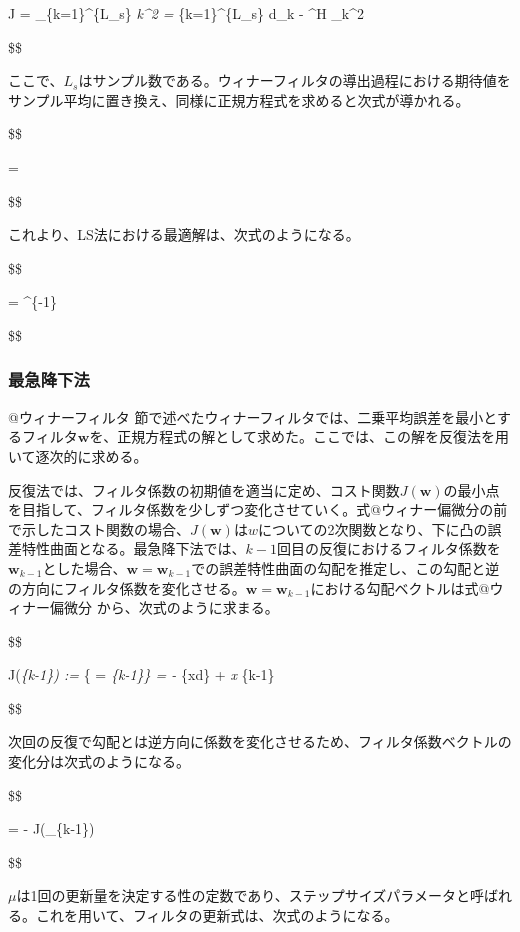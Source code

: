 J = \sum\_\{k=1\}\^{}\{L\_s\} \textbar{}\epsilon\emph{k\textbar\^{}2 =
\sum}\{k=1\}\^{}\{L\_s\} \textbar d\_k - \^{}H
\_k\textbar\^{}2

\$\$

ここで、\(L_s\)はサンプル数である。ウィナーフィルタの導出過程における期待値をサンプル平均に置き換え、同様に正規方程式を求めると次式が導かれる。

\$\$

  = 

\$\$

これより、LS法における最適解は、次式のようになる。

\$\$

 = \^{}\{-1\} 

\$\$

\hypertarget{ux6700ux6025ux964dux4e0bux6cd5}{%
\subsubsection{最急降下法}\label{ux6700ux6025ux964dux4e0bux6cd5}}

@ウィナーフィルタ
節で述べたウィナーフィルタでは、二乗平均誤差を最小とするフィルタ\(\bm{w}\)を、正規方程式の解として求めた。ここでは、この解を反復法を用いて逐次的に求める。

反復法では、フィルタ係数の初期値を適当に定め、コスト関数\(J(\bm{w})\)の最小点を目指して、フィルタ係数を少しずつ変化させていく。式@ウィナー偏微分の前
で示したコスト関数の場合、\(J(\bm{w})\)は\(w\)についての2次関数となり、下に凸の誤差特性曲面となる。最急降下法では、\(k-1\)回目の反復におけるフィルタ係数を\(\bm{w}_{k-1}\)とした場合、\(\bm{w} = \bm{w}_{k-1}\)での誤差特性曲面の勾配を推定し、この勾配と逆の方向にフィルタ係数を変化させる。\(\bm{w} = \bm{w}_{k-1}\)における勾配ベクトルは式@ウィナー偏微分
から、次式のように求まる。

\$\$

\nabra J(\emph{\{k-1\}) :=
 \textbar{}}\{ =
\emph{\{k-1\}\} = - }\{xd\} + \emph{x }\{k-1\}

\$\$

次回の反復で勾配とは逆方向に係数を変化させるため、フィルタ係数ベクトルの変化分は次式のようになる。

\$\$

\Delta {} = - \mu \nabla J(\_\{k-1\})

\$\$

\(\mu\)は1回の更新量を決定する性の定数であり、ステップサイズパラメータと呼ばれる。これを用いて、フィルタの更新式は、次式のようになる。

